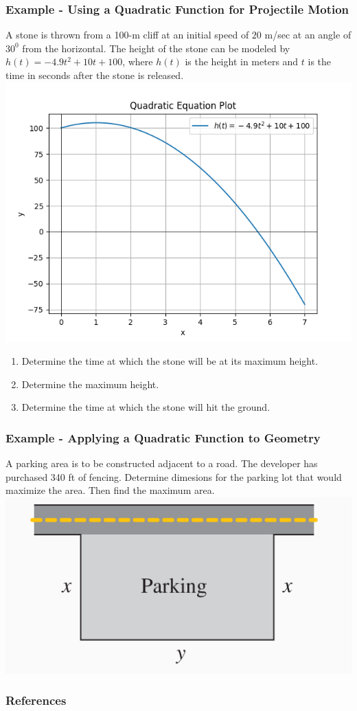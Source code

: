 \documentclass{beamer}
\begin{document}
\begin{frame}
    \frametitle{Example - Using a Quadratic Function for Projectile Motion}

    A stone is thrown from a 100-m cliff at an initial speed of \(20\) m/sec at an angle of \(30^0\) from the horizontal. The height of the stone can be modeled by \(h(t)=-4.9t^2 +10t +100\), where \(h(t)\) is the height in meters and \(t\) is the time in seconds after the stone is released. 
    \includegraphics[scale=0.2]{figs/Figure 4.png} 

    \begin{enumerate}
        \item Determine the time at which the stone will be at its maximum height.\pause
        \item Determine the maximum height. \pause
        \item Determine the time at which the stone will hit the ground. 
    \end{enumerate}

\end{frame}

\begin{frame}
    \frametitle{Example - Applying a Quadratic Function to Geometry}

    A parking area is to be constructed adjacent to a road. The developer has purchased 340 ft of fencing. Determine dimesions for the parking lot that would maximize the area. Then find the maximum area. \\
\includegraphics[scale=0.5]{figs/Figure 5.PNG}

\end{frame}



\begin{frame}
    \frametitle{References}
\end{frame}
\end{document}
